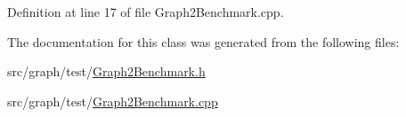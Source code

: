 Definition at line 17 of file Graph2\-Benchmark.\-cpp.



The documentation for this class was generated from the following files\-:\begin{DoxyCompactItemize}
\item 
src/graph/test/\hyperlink{_graph2_benchmark_8h}{Graph2\-Benchmark.\-h}\item 
src/graph/test/\hyperlink{_graph2_benchmark_8cpp}{Graph2\-Benchmark.\-cpp}\end{DoxyCompactItemize}

